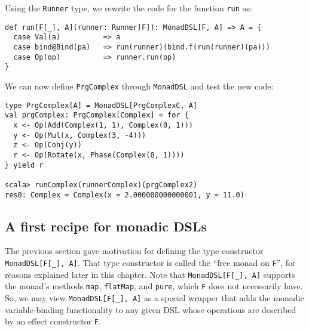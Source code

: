 Using the \lstinline!Runner!
type, we rewrite the code for the function \lstinline!run!
as:
\begin{lstlisting}
def run[F[_], A](runner: Runner[F]): MonadDSL[F, A] => A = {
  case Val(a)          => a
  case bind@Bind(pa)   => run(runner)(bind.f(run(runner)(pa)))
  case Op(op)          => runner.run(op)
}
\end{lstlisting}
We can now define \lstinline!PrgComplex!
through \lstinline!MonadDSL!
and test the new code:
\begin{lstlisting}
type PrgComplex[A] = MonadDSL[PrgComplexC, A]
val prgComplex: PrgComplex[Complex] = for {
  x <- Op(Add(Complex(1, 1), Complex(0, 1)))
  y <- Op(Mul(x, Complex(3, -4)))
  z <- Op(Conj(y))
  r <- Op(Rotate(x, Phase(Complex(0, 1))))
} yield r

scala> runComplex(runnerComplex)(prgComplex2)
res0: Complex = Complex(x = 2.000000000000001, y = 11.0)
\end{lstlisting}

\subsection{A first recipe for monadic DSLs\label{subsec:A-first-recipe-monadic-dsl}}

The previous section gave motivation for defining the type constructor
\lstinline!MonadDSL[F[_], A]!.
That type constructor is called the \textsf{``}free monad on \lstinline!F!\textsf{''},
for reasons explained later in this chapter. Note that \lstinline!MonadDSL[F[_], A]!
supports the monad\textsf{'}s methods \lstinline!map!,
\lstinline!flatMap!, and
\lstinline!pure!, which
\lstinline!F! does not
necessarily have. So, we may view \lstinline!MonadDSL[F[_], A]!
as a special wrapper that adds the monadic variable-binding functionality
to any given DSL whose operations are described by an effect constructor
\lstinline!F!.

